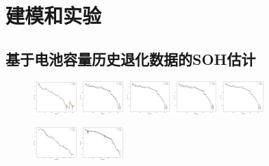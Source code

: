 \documentclass{beamer}
\begin{document}
\section{建模和实验}

\subsection{基于电池容量历史退化数据的SOH估计}

\begin{frame}
	\begin{figure}[htbp]
		\centering
			{\label{fig:subfig1}\includegraphics[width=0.15\textwidth]{figures/soh_cap/calce_CS2_35_ar.jpg}}
			{\label{fig:subfig2}\includegraphics[width=0.15\textwidth]{figures/soh_cap/calce_CS2_35_svr.jpg}}
			{\label{fig:subfig3}\includegraphics[width=0.15\textwidth]{figures/soh_cap/calce_CS2_35_mlp.jpg}}
			{\label{fig:subfig4}\includegraphics[width=0.15\textwidth]{figures/soh_cap/calce_CS2_35_lstm.jpg}}
			{\label{fig:subfig5}\includegraphics[width=0.15\textwidth]{figures/soh_cap/calce_CS2_35_cnn.jpg}}
	\end{figure}
	\begin{figure}[htbp]
		\centering
			{\label{fig:subfig1}\includegraphics[width=0.15\textwidth]{figures/soh_cap/calce_CS2_36_ar.jpg}}
			{\label{fig:subfig2}\includegraphics[width=0.15\textwidth]{figures/soh_cap/calce_CS2_36_svr.jpg}}

\end{figure}
\end{frame}
\end{document}
